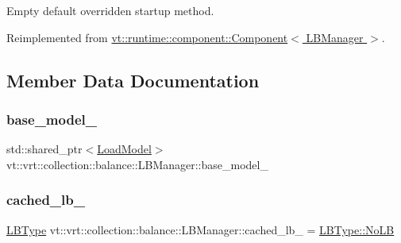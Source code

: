 Empty default overridden startup method. 



Reimplemented from \hyperlink{structvt_1_1runtime_1_1component_1_1_component_aad3974307ab3b2e1df389a91310f68c2}{vt\+::runtime\+::component\+::\+Component$<$ L\+B\+Manager $>$}.



\subsection{Member Data Documentation}
\mbox{\label{structvt_1_1vrt_1_1collection_1_1balance_1_1_l_b_manager_ace781095ef59c156a0b23dea6dea70db}} 
\subsubsection{\texorpdfstring{base\+\_\+model\+\_\+}{base\_model\_}}
{\footnotesize\ttfamily std\+::shared\+\_\+ptr$<$\hyperlink{classvt_1_1vrt_1_1collection_1_1balance_1_1_load_model}{Load\+Model}$>$ vt\+::vrt\+::collection\+::balance\+::\+L\+B\+Manager\+::base\+\_\+model\+\_\+\hspace{0.3cm}{\ttfamily [private]}}

\mbox{\label{structvt_1_1vrt_1_1collection_1_1balance_1_1_l_b_manager_aa21ee592ddcc09c269e546c0ebf47fd3}} 
\subsubsection{\texorpdfstring{cached\+\_\+lb\+\_\+}{cached\_lb\_}}
{\footnotesize\ttfamily \hyperlink{namespacevt_1_1vrt_1_1collection_1_1balance_ac4f99693509affcc67db182d4aad9b5c}{L\+B\+Type} vt\+::vrt\+::collection\+::balance\+::\+L\+B\+Manager\+::cached\+\_\+lb\+\_\+ = \hyperlink{namespacevt_1_1vrt_1_1collection_1_1balance_ac4f99693509affcc67db182d4aad9b5cad12268b59a4f1098aee001f9a1750020}{L\+B\+Type\+::\+No\+LB}\hspace{0.3cm}{\ttfamily [private]}}

